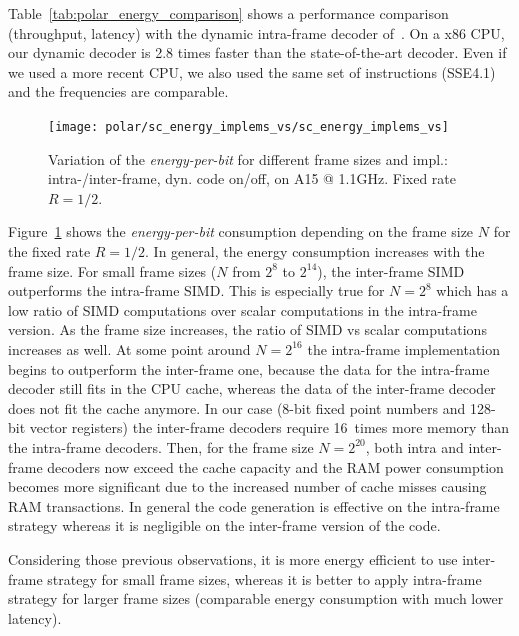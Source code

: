 Table~\ref{tab:polar_energy_comparison} shows a performance comparison
(throughput, latency) with the dynamic intra-frame decoder of~\cite{Giard2014}.
On a x86 CPU, our dynamic decoder is 2.8 times faster than the state-of-the-art
decoder. Even if we used a more recent CPU, we also used the same set of
instructions (SSE4.1) and the frequencies are comparable.

\begin{figure}
  \centering
  \texttt{[image: polar/sc\_energy\_implems\_vs/sc\_energy\_implems\_vs]}
  \caption{Variation of the \emph{energy-per-bit} for different frame sizes and
    impl.: intra-/inter-frame, dyn. code on/off, on A15 @ 1.1GHz. Fixed rate
    $R = 1/2$.}
  \label{plot:polar_sc_energy_implems_vs}
\end{figure}

Figure~\ref{plot:polar_sc_energy_implems_vs} shows the \emph{energy-per-bit}
consumption depending on the frame size $N$ for the fixed rate $R = 1/2$. In
general, the energy consumption increases with the frame size. For small frame
sizes ($N$ from $2^{8}$ to $2^{14}$), the inter-frame SIMD outperforms the
intra-frame SIMD. This is especially true for $N = 2^8$ which has a low ratio of
SIMD computations over scalar computations in the intra-frame version. As the
frame size increases, the ratio of SIMD vs scalar computations increases as
well. At some point around $N = 2^{16}$ the intra-frame implementation begins
to outperform the inter-frame one, because the data for the intra-frame decoder
still fits in the CPU cache, whereas the data of the inter-frame decoder does
not fit the cache anymore. In our case (8-bit fixed point numbers and 128-bit
vector registers) the inter-frame decoders require 16~times more memory than the
intra-frame decoders. Then, for the frame size $N = 2^{20}$, both intra and
inter-frame decoders now exceed the cache capacity and the RAM power consumption
becomes more significant due to the increased number of cache misses causing RAM
transactions. In general the code generation is effective on the intra-frame
strategy whereas it is negligible on the inter-frame version of the code.

Considering those previous observations, it is more energy efficient to use
inter-frame strategy for small frame sizes, whereas it is better to apply
intra-frame strategy for larger frame sizes (comparable energy consumption with
much lower latency).

